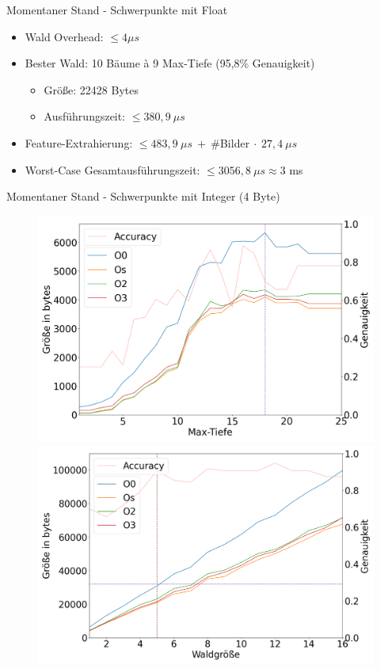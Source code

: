 \documentclass[10pt]{beamer}
\begin{document}
\begin{frame}{Momentaner Stand - Schwerpunkte mit Float}
\begin{itemize}
    \item Wald Overhead: $\leq 4\mu s$
    \item Bester Wald: 10 Bäume à 9 Max-Tiefe (95,8\% Genauigkeit)
    \begin{itemize}
        \item Größe: 22428 Bytes
        \item Ausführungszeit: $\leq 380,9\ \mu s$
    \end{itemize}
    \item Feature-Extrahierung: $\leq 483,9\ \mu s\ +\ $\#Bilder$\ \cdot \ 27,4\ \mu s$
    \item Worst-Case Gesamtausführungszeit: $\leq 3056,8\ \mu s \approx 3$ ms
\end{itemize}
\end{frame}

\begin{frame}{Momentaner Stand - Schwerpunkte mit Integer (4 Byte)}
\begin{figure}
    \begin{minipage}[c]{0.49\linewidth}
        \includegraphics[width=\linewidth]{klisch_int_tree.png}
    \end{minipage}
    \hfill
    \begin{minipage}[c]{0.49\linewidth}
        \includegraphics[width=\linewidth]{klisch_int_forest.png}

\end{minipage}
\end{figure}
\end{frame}
\end{document}
